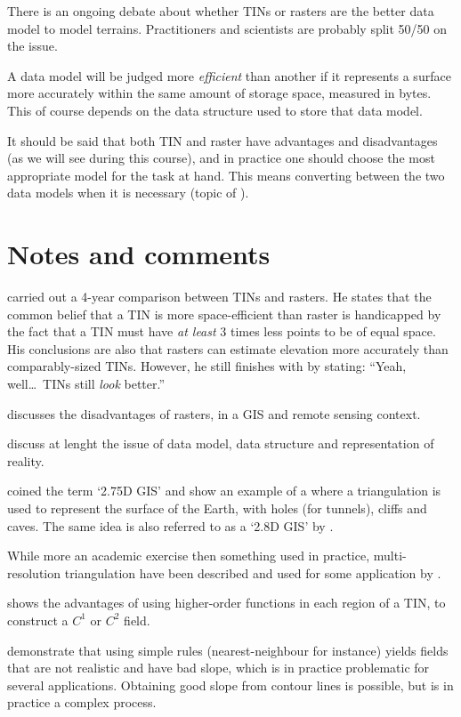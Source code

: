 There is an ongoing debate about whether TINs or rasters are the better data model to model terrains.
Practitioners and scientists are probably split 50/50 on the issue.

A data model will be judged more \emph{efficient} than another if it represents a surface more accurately within the same amount of storage space, measured in bytes.
This of course depends on the data structure used to store that data model.

It should be said that both TIN and raster have advantages and disadvantages (as we will see during this course), and in practice one should choose the most appropriate model for the task at hand.
This means converting between the two data models when it is necessary (topic of ).


%
\section{Notes and comments}

\citet{Kumler94} carried out a 4-year comparison between TINs and rasters.
He states that the common belief that a TIN is more space-efficient than raster is handicapped by the fact that a TIN must have \emph{at least} 3 times less points to be of equal space.
His conclusions are also that rasters can estimate elevation more accurately than comparably-sized TINs.
However, he still finishes with by stating: ``Yeah, well\ldots\ TINs still \emph{look} better.'' 

\citet{Fisher97} discusses the disadvantages of rasters, in a GIS and remote sensing context.

\citet{Frank92,Goodchild92a} discuss at lenght the issue of data model, data structure and representation of reality. 

\citet{Tse04} coined the term `2.75D GIS' and show an example of a where a triangulation is used to represent the surface of the Earth, with holes (for tunnels), cliffs and caves. 
The same idea is also referred to as a `2.8D GIS' by \citet{Groger05}.

While more an academic exercise then something used in practice, multi-resolution triangulation have been described and used for some application by \citet{DeFloriani02}.

\citet{Akima78} shows the advantages of using higher-order functions in each region of a TIN, to construct a $C^1$ or $C^2$ field. 

\citet{Dakowicz03} demonstrate that using simple rules (nearest-neighbour for instance) yields fields that are not realistic and have bad slope, which is in practice problematic for several applications.
Obtaining good slope from contour lines is possible, but is in practice a complex process.


